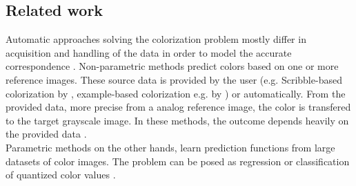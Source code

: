 \documentclass[12pt,letterpaper]{article}
\begin{document}
\subsection{Related work}
Automatic approaches solving the colorization problem mostly differ in acquisition and handling of the data in order to model the accurate correspondence \citep{Zhang.2016}. Non-parametric methods predict colors based on one or more reference images. These source data is provided by the user (e.g. Scribble-based colorization by \cite{Levin.2004}, example-based colorization e.g. by \cite{Welsh.2002}) or automatically. From the provided data, more precise from a analog reference image, the color is transfered to the target grayscale image. In these methods, the outcome depends heavily on the provided data \cite{Cheng_2015}.\\
Parametric methods on the other hands, learn prediction functions from large datasets of color images. The problem can be posed as regression or classification of quantized color values \citep{Zhang.2016}.


\end{document}
